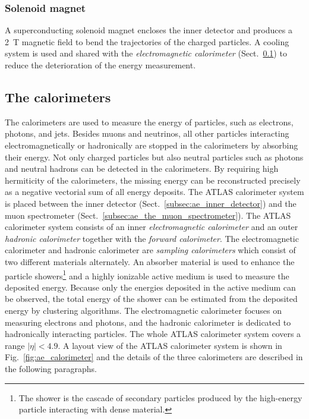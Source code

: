 
\subsubsection{Solenoid magnet}
\label{subsubsec:ae_magnetic}
A superconducting solenoid magnet encloses the inner detector and produces a 2~T magnetic field to bend the trajectories of the charged particles.
A cooling system is used and shared with the \textit{electromagnetic calorimeter} (Sect.~\ref{subsec:ae_calorimeter}) to reduce the deterioration of the energy measurement.


\subsection{The calorimeters}
\label{subsec:ae_calorimeter}
The calorimeters are used to measure the energy of particles, such as electrons, photons, and jets.
Besides muons and neutrinos, all other particles interacting electromagnetically or hadronically are stopped in the calorimeters by absorbing their energy.
Not only charged particles but also neutral particles such as photons and neutral hadrons can be detected in the calorimeters.
By requiring high hermiticity of the calorimeters, the missing energy \met can be reconstructed precisely as a negative vectorial sum of all energy deposits.
The ATLAS calorimeter system is placed between the inner detector (Sect.~\ref{subsec:ae_inner_detector}) and the muon spectrometer (Sect.~\ref{subsec:ae_the_muon_spectrometer}).
The ATLAS calorimeter system consists of an inner \textit{electromagnetic calorimeter} and an outer \textit{hadronic calorimeter} together with the \textit{forward calorimeter}.
The electromagnetic calorimeter and hadronic calorimeter are \textit{sampling calorimeters} which consist of two different materials alternately.
An absorber material is used to enhance the particle showers\footnote{The shower is the cascade of secondary particles produced by the high-energy particle interacting with dense material.} and a highly ionizable active medium is used to measure the deposited energy.
Because only the energies deposited in the active medium can be observed, the total energy of the shower can be estimated from the deposited energy by clustering algorithms.
The electromagnetic calorimeter focuses on measuring electrons and photons, and the hadronic calorimeter is dedicated to hadronically interacting particles.
The whole ATLAS calorimeter system covers a range $|\eta| < 4.9$.
A layout view of the ATLAS calorimeter system is shown in Fig.~\ref{fig:ae_calorimeter} and the details of the three calorimeters are described in the following paragraphs.

